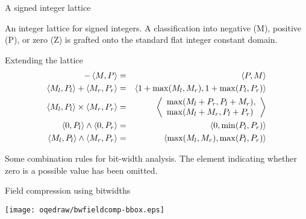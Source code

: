 \documentclass[%
pdf,
colorBG,
slideColor,
nototal,
oqe
]{prosper}
\begin{document}
\begin{slide}{A signed integer lattice}
\centering\renewcommand{\figscale}{0.6}%
\newcommand{\color}[2][rgb]{}%


\small
An integer lattice for signed integers. A classification into
negative (M), positive (P), or zero (Z) is grafted onto the standard
flat integer constant domain.
\end{slide}

\begin{slide}{Extending the lattice}
\begin{eqnarray*}
-\left\langle M,P \right\rangle &=& \left\langle P,M \right\rangle\\
\left\langle M_l,P_l \right\rangle + \left\langle M_r,P_r \right\rangle &=& \left\langle 1+\max(M_l,M_r),1+\max(P_l,P_r) \right\rangle\\
\left\langle M_l,P_l \right\rangle \times \left\langle M_r,P_r \right\rangle &=&
\left\langle \begin{array}{l}\max(M_l+P_r,P_l+M_r),\\
                       \max(M_l+M_r,P_l+P_r)\end{array} \right\rangle\\
\left\langle 0,P_l \right\rangle \wedge \left\langle 0,P_r \right\rangle &=& \left\langle 0,\min(P_l,P_r) \right\rangle\\
\left\langle M_l,P_l \right\rangle\wedge \left\langle M_r,P_r \right\rangle &=& \left\langle \max(M_l,M_r),\max(P_l,P_r) \right\rangle
\end{eqnarray*}

Some combination rules for bit-width analysis.  The 
element indicating whether zero is a possible value has been omitted.
\end{slide}

\begin{slide}{Field compression using bitwidths}

\begin{center}
\vspace{1cm}
\texttt{[image: oqedraw/bwfieldcomp-bbox.eps]}
\end{center}
\end{slide}
\end{document}
